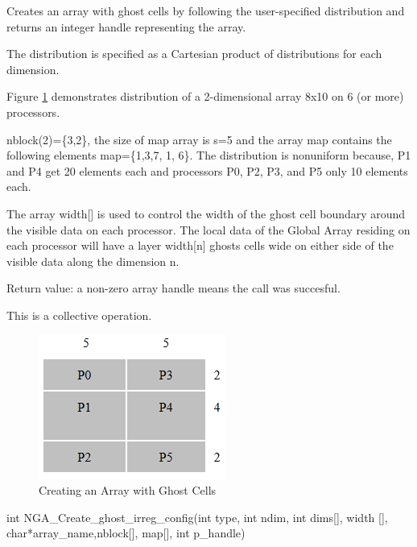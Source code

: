 \documentclass[12pt]{article}
\begin{document}
\begin{desc}

  Creates an array with ghost cells by following the user-specified
  distribution and returns an integer handle representing the array.

  The distribution is specified as a Cartesian product of
  distributions for each dimension. 

Figure \ref{crghostir} demonstrates distribution of a 2-dimensional
array 8x10 on 6 (or more) processors. 

nblock(2)=\{3,2\}, the size of map array is s=5 and the array map contains
the following elements map=\{1,3,7, 1, 6\}. The distribution is nonuniform
because, P1 and P4 get 20 elements each and processors P0, P2, P3, and P5
only 10 elements each.
 
The array width[] is used to control the width of the ghost cell boundary
around the visible data on each processor. The local data of the Global Array
residing on each processor will have a layer width[n] ghosts cells wide on
either side of the visible data along the dimension n. 

Return value: a non-zero array handle means the call was succesful. 

This is a collective operation.

\begin{figure}
\includegraphics{CrGhostIr}
\centering
\caption{Creating an Array with Ghost Cells}
\label{crghostir}
\end{figure}

\end{desc}



\begin{capi}
\begin{ccode}
int NGA_Create_ghost_irreg_config(int type, int ndim, int dims[],
                                  width [], char*array_name,nblock[],
                                  map[], int p_handle)
\end{ccode}
\begin{funcargs}
\end{funcargs}
\end{capi}
\end{document}
